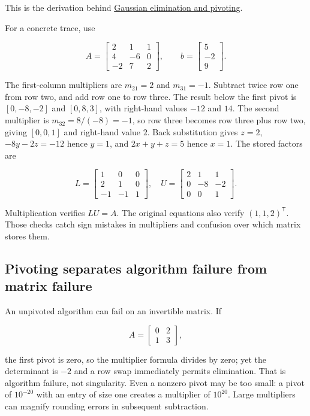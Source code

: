 This is the derivation behind \hyperref[01-foundations-i-ch019]{Gaussian elimination and pivoting}.

For a concrete trace, use

\[
A=\begin{bmatrix}2&1&1\\4&-6&0\\-2&7&2\end{bmatrix},\qquad
b=\begin{bmatrix}5\\-2\\9\end{bmatrix}.
\]

The first-column multipliers are \(m_{21}=2\) and \(m_{31}=-1\). Subtract twice row one from row two, and add row one to row three. The result below the first pivot is \([0,-8,-2]\) and \([0,8,3]\), with right-hand values \(-12\) and \(14\). The second multiplier is \(m_{32}=8/(-8)=-1\), so row three becomes row three plus row two, giving \([0,0,1]\) and right-hand value \(2\). Back substitution gives \(z=2\), \(-8y-2z=-12\) hence \(y=1\), and \(2x+y+z=5\) hence \(x=1\). The stored factors are

\[
L=\begin{bmatrix}1&0&0\\2&1&0\\-1&-1&1\end{bmatrix},\quad
U=\begin{bmatrix}2&1&1\\0&-8&-2\\0&0&1\end{bmatrix}.
\]

Multiplication verifies \(LU=A\). The original equations also verify \((1,1,2)^\mathsf T\). Those checks catch sign mistakes in multipliers and confusion over which matrix stores them.

\subsection{Pivoting separates algorithm failure from matrix failure}\label{pivoting-separates-algorithm-failure-from-matrix-failure}

An unpivoted algorithm can fail on an invertible matrix. If

\[
A=\begin{bmatrix}0&2\\1&3\end{bmatrix},
\]

the first pivot is zero, so the multiplier formula divides by zero; yet the determinant is \(-2\) and a row swap immediately permits elimination. That is algorithm failure, not singularity. Even a nonzero pivot may be too small: a pivot of \(10^{-20}\) with an entry of size one creates a multiplier of \(10^{20}\). Large multipliers can magnify rounding errors in subsequent subtraction.

